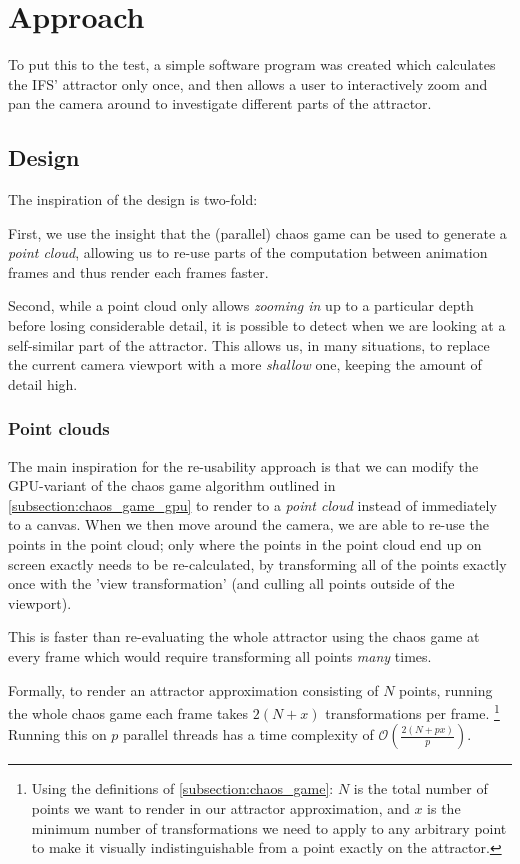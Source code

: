 \documentclass[11pt]{article}
\begin{document}
\section{Approach}
\label{sec:orgae4a53b}
\label{section:approach}

To put this to the test, a simple software program was created which calculates the IFS' attractor only once,
and then allows a user to interactively zoom and pan the camera around to investigate different parts of the attractor.

\subsection{Design}
\label{sec:org3cdbdd0}

The inspiration of the design is two-fold:

First, we use the insight that the (parallel) chaos game can be used to generate a \emph{point cloud}, allowing us to re-use parts of the computation between animation frames
and thus render each frames faster.

Second, while a point cloud only allows \emph{zooming in} up to a particular depth before losing considerable detail, 
it is possible to detect when we are looking at a self-similar part of the attractor.
This allows us, in many situations, to replace the current camera viewport with a more \emph{shallow} one, keeping the amount of detail high.

\subsubsection{Point clouds}
\label{sec:org6b49e1a}

The main inspiration for the re-usability approach is that we can modify the GPU-variant of the chaos game algorithm outlined in \autoref{subsection:chaos_game_gpu}
to render to a \emph{point cloud} instead of immediately to a canvas.
When we then move around the camera, we are able to re-use the points in the point cloud;
only where the points in the point cloud end up on screen exactly needs to be re-calculated, 
by transforming all of the points exactly once with the 'view transformation' 
(and culling all points outside of the viewport).

This is faster than re-evaluating the whole attractor using the chaos game at every frame which would require transforming all points \emph{many} times.

Formally, to render an attractor approximation consisting of \(N\) points, 
running the whole chaos game each frame takes \(2(N+x)\) transformations per frame. \footnote{Using the definitions of \autoref{subsection:chaos_game}: \(N\) is the total number of points we want to render in our attractor approximation, 
and \(x\) is the minimum number of transformations we need to apply to any arbitrary point to make it visually indistinguishable from a point exactly on the attractor.} 
Running this on \(p\) parallel threads has a time complexity of \(\mathcal{O}(\frac{2(N+px)}{p})\).
\end{document}
